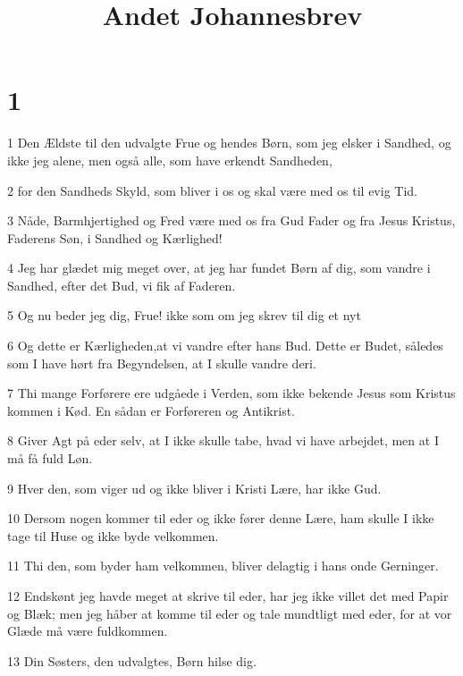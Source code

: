 

\title{Andet Johannesbrev}


\chapter{1}

\par 1 Den Ældste til den udvalgte Frue og hendes Børn, som jeg elsker i Sandhed, og ikke jeg alene, men også alle, som have erkendt Sandheden,
\par 2 for den Sandheds Skyld, som bliver i os og skal være med os til evig Tid.
\par 3 Nåde, Barmhjertighed og Fred være med os fra Gud Fader og fra Jesus Kristus, Faderens Søn, i Sandhed og Kærlighed!
\par 4 Jeg har glædet mig meget over, at jeg har fundet Børn af dig, som vandre i Sandhed, efter det Bud, vi fik af Faderen.
\par 5 Og nu beder jeg dig, Frue! ikke som om jeg skrev til dig et nyt
\par 6 Og dette er Kærligheden,at vi vandre efter hans Bud. Dette er Budet, således som I have hørt fra Begyndelsen, at I skulle vandre deri.
\par 7 Thi mange Forførere ere udgåede i Verden, som ikke bekende Jesus som Kristus kommen i Kød. En sådan er Forføreren og Antikrist.
\par 8 Giver Agt på eder selv, at I ikke skulle tabe, hvad vi have arbejdet, men at I må få fuld Løn.
\par 9 Hver den, som viger ud og ikke bliver i Kristi Lære, har ikke Gud.
\par 10 Dersom nogen kommer til eder og ikke fører denne Lære, ham skulle I ikke tage til Huse og ikke byde velkommen.
\par 11 Thi den, som byder ham velkommen, bliver delagtig i hans onde Gerninger.
\par 12 Endskønt jeg havde meget at skrive til eder, har jeg ikke villet det med Papir og Blæk; men jeg håber at komme til eder og tale mundtligt med eder, for at vor Glæde må være fuldkommen.
\par 13 Din Søsters, den udvalgtes, Børn hilse dig.



